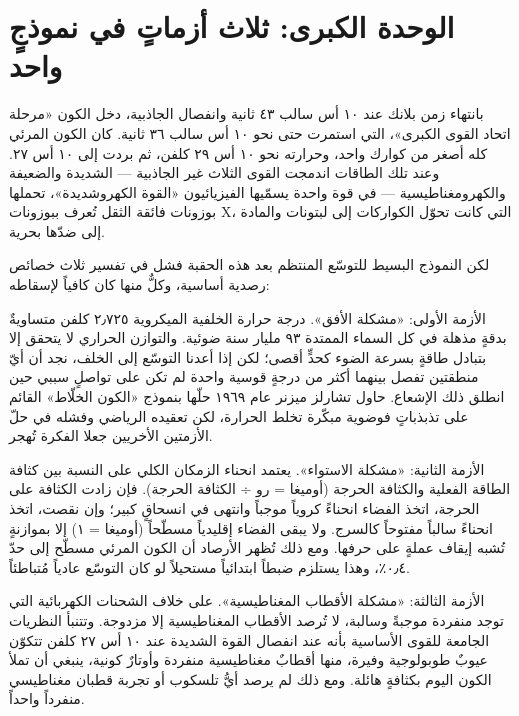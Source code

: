 \documentclass[12pt,a4paper,openany]{book}
\begin{document}
\chapter*{الوحدة الكبرى: ثلاث أزماتٍ في نموذجٍ واحد}




بانتهاء زمن بلانك عند ١٠ أس سالب ٤٣ ثانية وانفصال الجاذبية، دخل الكون «مرحلة اتحاد القوى الكبرى»، التي استمرت حتى نحو ١٠ أس سالب ٣٦ ثانية. كان الكون المرئي كله أصغر من كوارك واحد، وحرارته نحو ١٠ أس ٢٩ كلفن، ثم بردت إلى ١٠ أس ٢٧. وعند تلك الطاقات اندمجت القوى الثلاث غير الجاذبية — الشديدة والضعيفة والكهرومغناطيسية — في قوة واحدة يسمّيها الفيزيائيون «القوة الكهروشديدة»، تحملها بوزونات فائقة الثقل تُعرف ببوزونات X، التي كانت تحوّل الكواركات إلى لبتونات والمادة إلى ضدّها بحرية.


لكن النموذج البسيط للتوسّع المنتظم بعد هذه الحقبة فشل في تفسير ثلاث خصائص رصدية أساسية، وكلٌّ منها كان كافياً لإسقاطه:


الأزمة الأولى: «مشكلة الأفق». درجة حرارة الخلفية الميكروية ٢٫٧٢٥ كلفن متساويةٌ بدقةٍ مذهلة في كل السماء الممتدة ٩٣ مليار سنة ضوئية. والتوازن الحراري لا يتحقق إلا بتبادل طاقةٍ بسرعة الضوء كحدٍّ أقصى؛ لكن إذا أعدنا التوسّع إلى الخلف، نجد أن أيّ منطقتين تفصل بينهما أكثر من درجةٍ قوسية واحدة لم تكن على تواصلٍ سببي حين انطلق ذلك الإشعاع. حاول تشارلز ميزنر عام ١٩٦٩ حلّها بنموذج «الكون الخلّاط» القائم على تذبذباتٍ فوضوية مبكّرة تخلط الحرارة، لكن تعقيده الرياضي وفشله في حلّ الأزمتين الأخريين جعلا الفكرة تُهجر.


الأزمة الثانية: «مشكلة الاستواء». يعتمد انحناء الزمكان الكلي على النسبة بين كثافة الطاقة الفعلية والكثافة الحرجة (أوميغا = رو ÷ الكثافة الحرجة). فإن زادت الكثافة على الحرجة، اتخذ الفضاء انحناءً كروياً موجباً وانتهى في انسحاقٍ كبير؛ وإن نقصت، اتخذ انحناءً سالباً مفتوحاً كالسرج. ولا يبقى الفضاء إقليدياً مسطّحاً (أوميغا = ١) إلا بموازنةٍ تُشبه إيقاف عملةٍ على حرفها. ومع ذلك تُظهر الأرصاد أن الكون المرئي مسطّح إلى حدّ ٠٫٤٪، وهذا يستلزم ضبطاً ابتدائياً مستحيلاً لو كان التوسّع عادياً مُتباطئاً.


الأزمة الثالثة: «مشكلة الأقطاب المغناطيسية». على خلاف الشحنات الكهربائية التي توجد منفردة موجبةً وسالبة، لا تُرصد الأقطاب المغناطيسية إلا مزدوجة. وتتنبأ النظريات الجامعة للقوى الأساسية بأنه عند انفصال القوة الشديدة عند ١٠ أس ٢٧ كلفن تتكوّن عيوبٌ طوبولوجية وفيرة، منها أقطابٌ مغناطيسية منفردة وأوتارٌ كونية، ينبغي أن تملأ الكون اليوم بكثافةٍ هائلة. ومع ذلك لم يرصد أيُّ تلسكوب أو تجربة قطبان مغناطيسي منفرداً واحداً.
\end{document}
